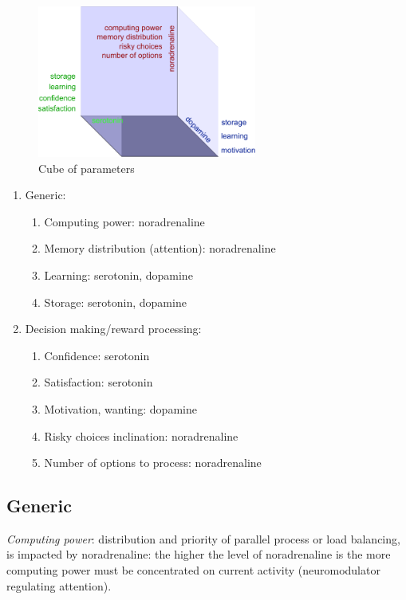 \begin{figure}
\begin{center}
 \includegraphics[height=5cm]{figure3_cube_of_parameters}
\end{center}
\caption{Cube of parameters}
\end{figure}

\begin{enumerate}
 \item  Generic:
 \begin{enumerate}
  \item  Computing power: noradrenaline
  \item  Memory distribution (attention): noradrenaline
  \item  Learning: serotonin, dopamine
  \item  Storage: serotonin, dopamine
 \end{enumerate}
 \item  Decision making/reward processing:
 \begin{enumerate}
  \item  Confidence: serotonin
  \item  Satisfaction: serotonin
  \item  Motivation, wanting: dopamine
  \item  Risky choices inclination: noradrenaline
  \item  Number of options to process: noradrenaline
 \end{enumerate}
\end{enumerate}

\subsection{Generic}

\emph{Computing power}: distribution and priority of parallel process or load balancing, is impacted by noradrenaline: the higher the level of noradrenaline is the more computing power must be concentrated on current activity (neuromodulator regulating attention).

